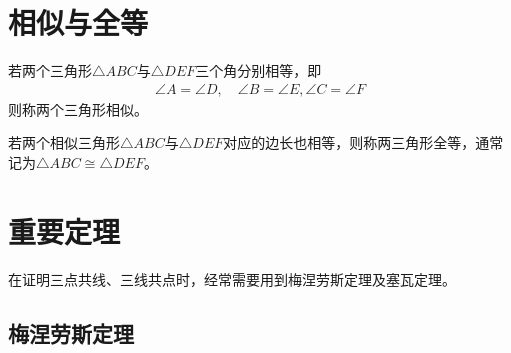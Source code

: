 \section{相似与全等}
\label{sec:similar-and-congruent}

\begin{definition}
  若两个三角形$\triangle ABC$与$\triangle DEF$三个角分别相等，即
  \begin{align*}
    \angle A = \angle D,\quad \angle B = \angle E, \angle C = \angle F
  \end{align*}
  则称两个三角形相似。
\end{definition}

\begin{definition}[全等，Congruent]
  若两个相似三角形$\triangle ABC$与$\triangle DEF$对应的边长也相等，则称两三角形全等，通常记为$\triangle ABC \cong \triangle DEF$。
\end{definition}

\section{重要定理}
\label{sec:important-triangle-theorems}

在证明三点共线、三线共点时，经常需要用到梅涅劳斯定理及塞瓦定理。

\subsection{梅涅劳斯定理}
\label{sec:Menelaus's-theorem}


